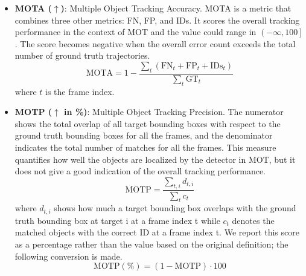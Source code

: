 \begin{itemize}
\item \textbf{MOTA ($\uparrow$)}: Multiple Object Tracking Accuracy. MOTA is a metric that combines three other metrics: FN, FP, and IDs. It scores the overall tracking performance in the context of MOT and the value could range in $\left( -\infty, 100 \right]$. The score becomes negative when the overall error count exceeds the total number of ground truth trajectories.
\begin{equation}
\text{MOTA} = 1 - \frac{\sum_{t} (\text{FN}_{t} + \text{FP}_{t} + \text{IDs}_{t})}{\sum_{t}\text{GT}_{t}}
\label{eqn:MOTA}
\end{equation}
where $t$ is the frame index.

\item \textbf{MOTP ($\uparrow$ in \%)}: Multiple Object Tracking Precision. The numerator shows the total overlap of all target bounding boxes with respect to the ground truth bounding boxes for all the frames, and the denominator indicates the total number of matches for all the frames. This measure quantifies how well the objects are localized by the detector in MOT, but it does not give a good indication of the overall tracking performance.
\begin{equation} 
\text{MOTP} = \frac{\sum_{t,i} d_{t,i}}{\sum_{t}c_{t}}
\label{eqn:MOTP}
\end{equation}
where $d_{t,i}$ shows how much a target bounding box overlaps with the ground truth bounding box at target i at a frame index t while $c_{t}$ denotes the matched objects with the correct ID at a frame index t. We report this score as a percentage rather than the value based on the original definition; the following conversion is made.
\begin{equation} 
\text{MOTP} (\%) = (1 - \text{MOTP}) \cdot 100
\label{eqn:MOTP_percentage}
\end{equation}

\end{itemize}

